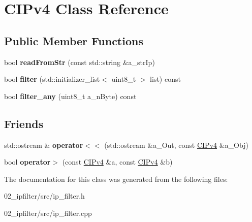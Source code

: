 \hypertarget{classCIPv4}{}\section{C\+I\+Pv4 Class Reference}
\label{classCIPv4}
\subsection*{Public Member Functions}
\begin{DoxyCompactItemize}
\item 
\mbox{\label{classCIPv4_a6fc10ad9fd0c251d2b47de2690a27c5b}} 
bool {\bfseries read\+From\+Str} (const std\+::string \&a\+\_\+str\+Ip)
\item 
\mbox{\label{classCIPv4_a7d20227705489e458862ab7ccaa9a311}} 
bool {\bfseries filter} (std\+::initializer\+\_\+list$<$ uint8\+\_\+t $>$ list) const
\item 
\mbox{\label{classCIPv4_a3bde25d053a2d2c3fa8366f9b27c62f8}} 
bool {\bfseries filter\+\_\+any} (uint8\+\_\+t a\+\_\+n\+Byte) const
\end{DoxyCompactItemize}
\subsection*{Friends}
\begin{DoxyCompactItemize}
\item 
\mbox{\label{classCIPv4_adf81293f9395bd109a3c2cf0bfd2e77d}} 
std\+::ostream \& {\bfseries operator$<$$<$} (std\+::ostream \&a\+\_\+\+Out, const \hyperlink{classCIPv4}{C\+I\+Pv4} \&a\+\_\+\+Obj)
\item 
\mbox{\label{classCIPv4_a610fd600a6d7ba48f9a628afb39f6d05}} 
bool {\bfseries operator$>$} (const \hyperlink{classCIPv4}{C\+I\+Pv4} \&a, const \hyperlink{classCIPv4}{C\+I\+Pv4} \&b)
\end{DoxyCompactItemize}


The documentation for this class was generated from the following files\+:\begin{DoxyCompactItemize}
\item 
02\+\_\+ipfilter/src/ip\+\_\+filter.\+h\item 
02\+\_\+ipfilter/src/ip\+\_\+filter.\+cpp\end{DoxyCompactItemize}
